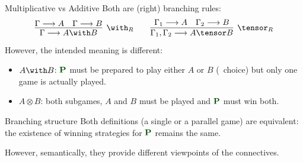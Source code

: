 \documentclass[9pt]{beamer}
\renewcommand{\emph}[1]{{\color{blue} #1}}
\newcommand{\empha}[1]{{\color{darkgreen} #1}}
\newcommand{\emphb}[1]{{\color{darkvio} #1}}
\newcommand{\emphdr}[1]{{\color{darkred} #1}}
\begin{document}
\begin{frame}{Multiplicative vs Additive}
\empha{Both are (right) branching rules}:
 \[
 \infer[\with_R]{\Gamma \lra A \with B}
{\Gamma \lra A & \Gamma \lra B}
\qquad
\infer[\tensor_R]{\Gamma_1, \Gamma_2 \lra A \tensor B}
{\Gamma_1 \lra A & \Gamma_2 \lra B}
 \]
 \emphb{However}, the intended meaning is different:

\begin{itemize}
 \item \emphdr{$A \with B$}: $\PP$ must be prepared to play either $A$ or $B$ (\OO\ choice) but \emph{only one game}  is actually played. 
 \item \emphdr{$A \otimes B$}: \emph{both} subgames,   $A$ and $B$ must be played and $\PP$ must win both. %

\end{itemize}
\pause
\begin{block}{Branching structure}
Both definitions (a single or a parallel game) are equivalent:  \empha{the existence of winning strategies for $\PP$ remains the same}. 

\emph{However, semantically, they provide different viewpoints of the connectives.}
\end{block}
\end{frame}
\end{document}
